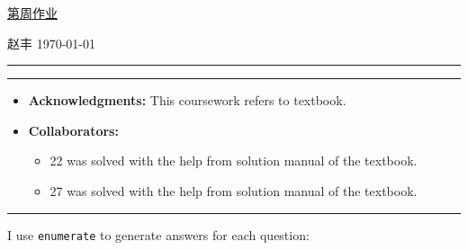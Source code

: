 \documentclass[a4paper]{article}
\begin{document}
\courseheader

\setcounter{hwcnt}{10} %

\begin{center}
  \underline{第\thehwcnt 周作业} \\
\end{center}
\begin{flushleft}
  赵丰\quad \studentID\hfill
  \today
\end{flushleft}
\hrule

\vspace{2em}

\flushleft
\rule{\textwidth}{1pt}
\begin{itemize}
\item {\bf Acknowledgments: \/} 
  This coursework refers to textbook.  
\item {\bf Collaborators: \/}
  \begin{itemize}
  \item 22 was solved with the help from solution manual of the textbook.
  \item 27 was solved with the help from solution manual of the textbook.  
  \end{itemize}
\end{itemize}
\rule{\textwidth}{1pt}

\vspace{2em}

I use \texttt{enumerate} to generate answers for each question:
\end{document}

